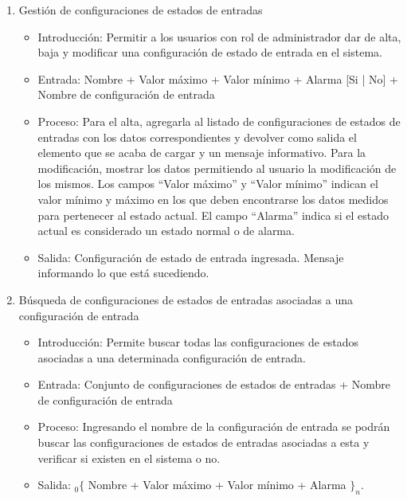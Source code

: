 \begin{enumerate}
			\item Gestión de configuraciones de estados de entradas
				\begin{itemize}
					\item Introducción: Permitir a los usuarios con rol de administrador dar de alta, baja y modificar una configuración de estado de entrada en el sistema.
					\item Entrada: Nombre + Valor máximo + Valor mínimo + Alarma [Si | No] + Nombre de configuración de entrada 
					\item Proceso: Para el alta, agregarla al listado de configuraciones de estados de entradas con los datos correspondientes y devolver como salida el elemento que se acaba de cargar y un mensaje informativo.
					Para la modificación, mostrar los datos permitiendo al usuario la modificación de los mismos.
					Los campos ``Valor máximo'' y ``Valor mínimo''  indican el valor mínimo y máximo en los que deben encontrarse los datos medidos para pertenecer al estado actual.
					El campo ``Alarma'' indica si el estado actual es considerado un estado normal o de alarma.
					\item Salida: Configuración de estado de entrada ingresada. Mensaje informando lo que está sucediendo.
				\end{itemize}

			\item Búsqueda de configuraciones de estados de entradas asociadas a una configuración de entrada
				\begin{itemize}
					\item Introducción: Permite buscar todas las configuraciones de estados asociadas a una determinada configuración de entrada.
					\item Entrada: Conjunto de configuraciones de estados de entradas + Nombre de configuración de entrada
					\item Proceso: Ingresando el nombre de la configuración de entrada se podrán buscar las configuraciones de estados de entradas asociadas a esta y verificar si existen en el sistema o no.
					\item Salida: ${}_{0}\{$ Nombre + Valor máximo + Valor mínimo + Alarma $\}_n$.
				\end{itemize}
	

\end{enumerate}
